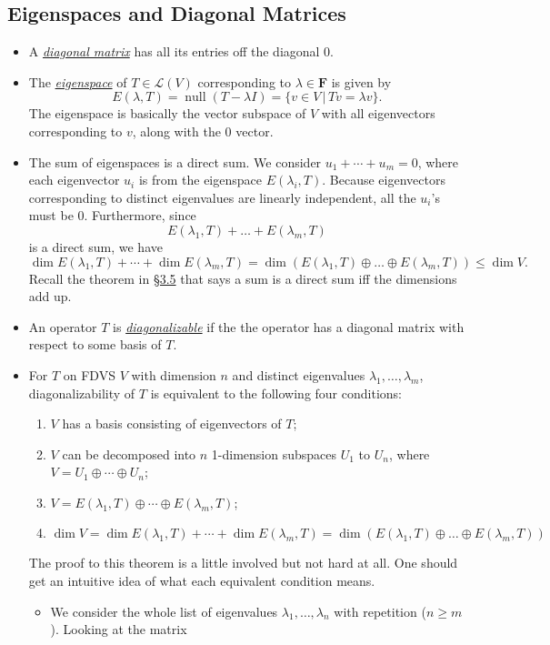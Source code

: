 \documentclass[11pt]{article}
\newcommand{\lk}[2]{\hyperlink{subsection.#1.#2}{\S#1.#2}}
\newcommand{\where}{\,|\,}
\newcommand{\df}[1]{\ul{\textit{\textsf{#1}}}}
\newcommand{\F}{\mathbf{F}}
\newcommand{\n}{\operatorname{null}}
\renewcommand{\d}{\dim}
\newcommand{\LV}{\mathcal{L}(V)}
\begin{document}
\subsection{Eigenspaces and Diagonal Matrices}
\begin{itemize}
    \item A \df{diagonal matrix} has all its entries off the diagonal 0.
    \item The \df{eigenspace} of $T \in \LV$ corresponding to $\lambda \in \F$ is given by $$E(\lambda,T) = \n (T-\lambda I) = \{v \in V \where Tv = \lambda v\}.$$
    The eigenspace is basically the vector subspace of $V$ with all eigenvectors corresponding to $v$, along with the 0 vector.
    \item The sum of eigenspaces is a direct sum. We consider $u_1+\cdots+u_m = 0$, where each eigenvector $u_i$ is from the eigenspace $E(\lambda_i,T)$. Because eigenvectors corresponding to distinct eigenvalues are linearly independent, all the $u_i$'s must be 0. Furthermore, since $$E(\lambda_1,T)+\dots+E(\lambda_m,T)$$ is a direct sum, we have $$\d E(\lambda_1,T) + \cdots + \d E(\lambda_m,T) = \d (E(\lambda_1,T) \oplus \dots \oplus E(\lambda_m,T)) \leq \d V.$$ Recall the theorem in \lk{3}{5} that says a sum is a direct sum iff the dimensions add up.
    \item An operator $T$ is \df{diagonalizable} if the the operator has a diagonal matrix with respect to some basis of $T$.
    \item For $T$ on FDVS $V$ with dimension $n$ and distinct eigenvalues $\lambda_1, \dots, \lambda_m$, diagonalizability of $T$ is equivalent to the following four conditions:
    \begin{enumerate}[label=(\alph*)]
        \item $V$ has a basis consisting of eigenvectors of $T$;
        \item $V$ can be decomposed into $n$ 1-dimension subspaces $U_1$ to $U_n$, where $V = U_1 \oplus \cdots \oplus U_n$;
        \item $V = E(\lambda_1,T) \oplus \cdots \oplus E(\lambda_m,T)$;
        \item $\d V = \d E(\lambda_1,T) + \cdots + \d E(\lambda_m,T) = \d (E(\lambda_1,T) \oplus \dots \oplus E(\lambda_m,T))$
    \end{enumerate}
    The proof to this theorem is a little involved but not hard at all. One should get an intuitive idea of what each equivalent condition means.
    \begin{itemize}
    \item We consider the whole list of eigenvalues $\lambda_1, \dots, \lambda_n$ with repetition ($n \geq m$). Looking at the matrix

\end{itemize}
\end{itemize}
\end{document}
